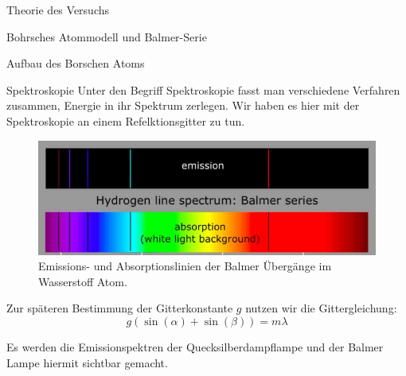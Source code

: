 \documentclass[pdftex, a4paper,11pt, twoside, ngerman]{report}
\begin{document}
\begin{chapter}{Theorie des Versuchs}
\begin{section}{Bohrsches Atommodell und Balmer-Serie}
\begin{subsection}{Aufbau des Borschen Atoms}
        
      \end{subsection}
      
      
      
      \begin{subsection}{Spektroskopie}
        \label{chp:TheorieBohrBalmerSerieSpektroskopie}
        Unter den Begriff Spektroskopie fasst man verschiedene Verfahren zusammen, Energie in ihr Spektrum zerlegen.
        Wir haben es hier mit der Spektroskopie an einem Refelktionsgitter zu tun.
        \begin{figure}[b]
          \begin{center}
            \includegraphics[width=.9\textwidth]{Figures/BalmerserieEmissionAbsorption.png}
            \caption{Emissions- und Absorptionslinien der Balmer Übergänge im Wasserstoff Atom.\cite{bib:BalmerserieEmissionAbsorption}}\label{fig:BalmerserieEmissionAbsorption}
          \end{center}
        \end{figure}
        Zur späteren Bestimmung der Gitterkonstante $g$ nutzen wir die Gittergleichung:
        \begin{equation}
          \label{eq:Gittergleichung}
          g(\sin(\alpha)+\sin(\beta))=m\lambda
        \end{equation}
        
        
        Es werden die Emissionspektren der Quecksilberdampflampe und der Balmer Lampe hiermit sichtbar gemacht.
        

\end{subsection}
\end{section}
\end{chapter}
\end{document}
